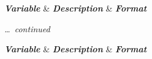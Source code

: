 \tabularnewline\addlinespace

\toprule\toprule
\emph{\textbf{Variable}}        &       \emph{\textbf{Description}}     &       \emph{\textbf{Format}}  \tabularnewline
\midrule
\endfirsthead

\caption[]{\emph{\ldots\ continued}}\tabularnewline\addlinespace
\toprule\toprule
\emph{\textbf{Variable}}        &       \emph{\textbf{Description}}     &       \emph{\textbf{Format}}  \tabularnewline
\midrule
\endhead



\addlinespace
{} \tabularnewline\addlinespace%
\endfoot

\bottomrule\bottomrule
\endlastfoot